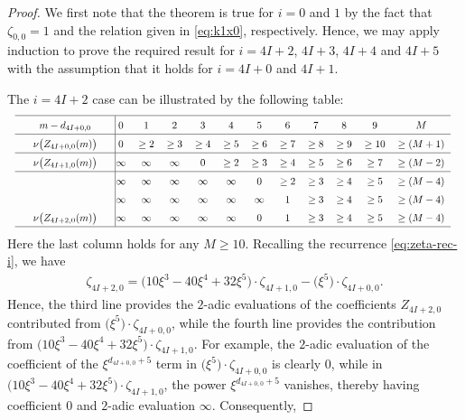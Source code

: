 \documentclass[12pt,reqno]{amsart}
\numberwithin{equation}{section}
\theoremstyle{theorem}
\theoremstyle{definition}
\begin{document}
\begin{proof}
	We first note that the theorem is true for $i=0$ and $1$ by the fact that $\zeta_{0,0}=1$ and the relation given in \eqref{eq:k1x0}, respectively. Hence, we may apply induction to prove the required result for $i=4I+2$, $4I+3$, $4I+4$ and $4I+5$ with the assumption that it holds for $i=4I+0$ and $4I+1$.
	
	The $i=4I+2$ case can be illustrated by the following table:
	\begin{align*}
		\renewcommand\arraystretch{1.5}
		\scalebox{0.8}{%
		\begin{tabular*}{1.25\textwidth}{p{0pt}cp{0pt}|@{\extracolsep{\fill}}ccccccccccc}
			\hline
			& $m-d_{4I+0,0}$ && $0$ & $1$ & $2$ & $3$ & $4$ & $5$ & $6$ & $7$ & $8$ & $9$ & $M$\\
			\hline
			& $\nu\big(Z_{4I+0,0}(m)\big)$ && $0$ & $\ge 2$ & $\ge 3$ & $\ge 4$ & $\ge 5$ & $\ge 6$ & $\ge 7$ & $\ge 8$ & $\ge 9$ & $\ge 10$ & $\ge (M+1)$\\
			\hline
			& $\nu\big(Z_{4I+1,0}(m)\big)$ && $\infty$ & $\infty$ & $\infty$ & $0$ & $\ge 2$ & $\ge 3$ & $\ge 4$ & $\ge 5$ & $\ge 6$ & $\ge 7$ & $\ge (M-2)$\\
			\hline
			&  && $\infty$ & $\infty$ & $\infty$ & $\infty$ & $\infty$ & $0$ & $\ge 2$ & $\ge 3$ & $\ge 4$ & $\ge 5$ & $\ge (M-4)$\\
			&  && $\infty$ & $\infty$ & $\infty$ & $\infty$ & $\infty$ & $\infty$ & $1$ & $\ge 3$ & $\ge 4$ & $\ge 5$ & $\ge (M-4)$\\
			& $\nu\big(Z_{4I+2,0}(m)\big)$ && $\infty$ & $\infty$ & $\infty$ & $\infty$ & $\infty$ & $0$ & $1$ & $\ge 3$ & $\ge 4$ & $\ge 5$ & $\ge (M-4)$\\
			\hline
		\end{tabular*}
	}
	\end{align*}
	Here the last column holds for any $M\ge 10$. Recalling the recurrence \eqref{eq:zeta-rec-i}, we have
	\begin{align*}
		\zeta_{4I+2,0} = \big(10 \xi^3 - 40 \xi^4 + 32 \xi^5\big)\cdot \zeta_{4I+1,0} - \big(\xi^5\big)\cdot \zeta_{4I+0,0}.
	\end{align*}
	Hence, the third line provides the $2$-adic evaluations of the coefficients $Z_{4I+2,0}$ contributed from $\big(\xi^5\big)\cdot \zeta_{4I+0,0}$, while the fourth line provides the contribution from $\big(10 \xi^3 - 40 \xi^4 + 32 \xi^5\big)\cdot \zeta_{4I+1,0}$. For example, the $2$-adic evaluation of the coefficient of the $\xi^{d_{4I+0,0}+5}$ term in $\big(\xi^5\big)\cdot \zeta_{4I+0,0}$ is clearly $0$, while in $\big(10 \xi^3 - 40 \xi^4 + 32 \xi^5\big)\cdot \zeta_{4I+1,0}$, the power $\xi^{d_{4I+0,0}+5}$ vanishes, thereby having coefficient $0$ and $2$-adic evaluation $\infty$. Consequently,

\end{proof}
\end{document}
